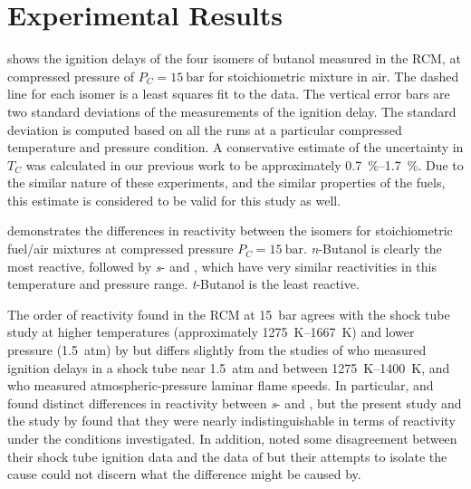 \documentclass[12pt, letterpaper]{article}
\begin{document}
\section{Experimental Results}
\label{sec:buoh-expts}

 shows the ignition delays of the four isomers of
butanol measured in the RCM, at compressed pressure of $P_C=\SI{15}{\bar}$ for
stoichiometric mixture in air. The dashed line for each isomer is a least
squares fit to the data. The vertical error bars are two standard deviations
of the measurements of the ignition delay. The standard deviation is computed
based on all the runs at a particular compressed temperature and pressure
condition. A conservative estimate of the uncertainty in $T_C$ was calculated
in our previous work to be approximately \SIrange{0.7}{1.7}{\percent}. Due to the similar nature
of these experiments, and the similar properties of the fuels, this estimate
is considered to be valid for this study as well.

 demonstrates the differences in reactivity between
the isomers for stoichiometric fuel/air mixtures at compressed pressure
$P_C=\SI{15}{\bar}$. \textit{n}-Butanol is clearly the most reactive, followed by
\textit{s}- and \iBuOH{}, which have very similar reactivities in
this temperature and pressure range. \textit{t}-Butanol is the least reactive.

The order of reactivity found in the RCM at \SI{15}{\bar} agrees with the shock tube
study at higher temperatures (approximately \SIrange{1275}{1667}{\kelvin}) and lower pressure
(\SI{1.5}{atm}) by \textcite{Stranic2012} but differs slightly from the studies of
\textcite{Moss2008} who measured ignition delays in a shock tube near \SI{1.5}{atm}
and between \SIrange{1275}{1400}{\kelvin}, and \textcite{Veloo2011a} who measured
atmospheric-pressure laminar flame speeds. In particular, \textcite{Moss2008}
and \textcite{Veloo2011a} found distinct differences in reactivity between
\textit{s}- and \iBuOH{}, but the present study and the study by
\textcite{Stranic2012} found that they were nearly indistinguishable in terms
of reactivity under the conditions investigated. In addition,
\textcite{Stranic2012} noted some disagreement between their shock tube
ignition data and the data of \textcite{Moss2008} but their attempts to isolate
the cause could not discern what the difference might be caused by.
\end{document}

